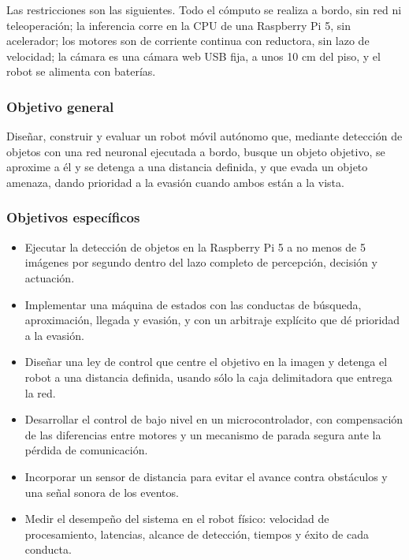 \documentclass[pdflatex,sn-mathphys-num]{sn-jnl}
\begin{document}
Las restricciones son las siguientes. Todo el c\'omputo se realiza a bordo, sin
red ni teleoperaci\'on; la inferencia corre en la CPU de una Raspberry Pi 5, sin
acelerador; los motores son de corriente continua con reductora, sin lazo de
velocidad; la c\'amara es una c\'amara web USB fija, a unos 10 cm del piso, y el
robot se alimenta con bater\'ias.

\subsubsection{Objetivo general}

Dise\~nar, construir y evaluar un robot m\'ovil aut\'onomo que, mediante
detecci\'on de objetos con una red neuronal ejecutada a bordo, busque un objeto
objetivo, se aproxime a \'el y se detenga a una distancia definida, y que evada
un objeto amenaza, dando prioridad a la evasi\'on cuando ambos est\'an a la
vista.

\subsubsection{Objetivos espec\'ificos}

\begin{itemize}
  \item Ejecutar la detecci\'on de objetos en la Raspberry Pi 5 a no menos de
        5 im\'agenes por segundo dentro del lazo completo de percepci\'on,
        decisi\'on y actuaci\'on.
  \item Implementar una m\'aquina de estados con las conductas de b\'usqueda,
        aproximaci\'on, llegada y evasi\'on, y con un arbitraje expl\'icito que
        d\'e prioridad a la evasi\'on.
  \item Dise\~nar una ley de control que centre el objetivo en la imagen y
        detenga el robot a una distancia definida, usando s\'olo la caja
        delimitadora que entrega la red.
  \item Desarrollar el control de bajo nivel en un microcontrolador, con
        compensaci\'on de las diferencias entre motores y un mecanismo de
        parada segura ante la p\'erdida de comunicaci\'on.
  \item Incorporar un sensor de distancia para evitar el avance contra
        obst\'aculos y una se\~nal sonora de los eventos.
  \item Medir el desempe\~no del sistema en el robot f\'isico: velocidad de
        procesamiento, latencias, alcance de detecci\'on, tiempos y \'exito de
        cada conducta.
\end{itemize}
\end{document}
